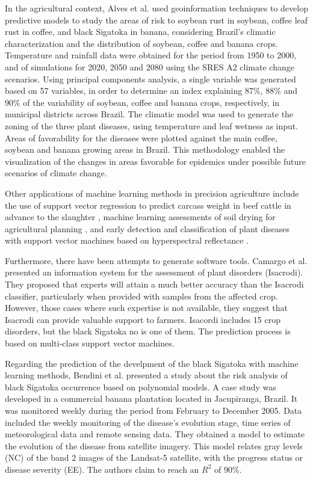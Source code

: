 \documentclass[review]{elsarticle}
\begin{document}
In the agricultural context, Alves et al. \citep{Alves2011} used  geoinformation techniques to develop predictive models to study the areas of risk to soybean rust in soybean, coffee leaf rust in coffee, and black Sigatoka in banana, considering Brazil’s climatic characterization and the distribution of soybean, coffee and banana crops. Temperature and rainfall data were obtained for the period from 1950 to 2000, and of simulations for 2020, 2050 and 2080 using the SRES A2 climate change scenarios. Using principal components analysis, a single variable was generated based on 57 variables, in order to determine an index explaining 87\%, 88\% and 90\% of the variability of soybean, coffee and banana crops, respectively, in municipal districts across Brazil. The climatic model was used to generate the zoning of the three plant diseases, using temperature and leaf wetness as input. Areas of favorability for the diseases were plotted against the main coffee, soybean and banana growing areas in Brazil. This methodology enabled the visualization of the changes in areas favorable for epidemics under possible future scenarios of climate change.

Other applications of machine learning methods in precision agriculture include the use of support vector regression to predict carcass weight in beef cattle in advance to the slaughter  \citep{Alonso2013}, machine learning assessments of soil drying for agricultural planning \citep{Coopersmith2014}, and early detection and classification of plant diseases with support vector machines based on hyperspectral reflectance \citep{Rumpf2010}.

Furthermore, there have been attempts to generate software tools. Camargo et al. \citep{Camargo2012} presented an information system for the assessment of plant disorders (Isacrodi). They proposed that experts will attain a much better accuracy than the Isacrodi classifier, particularly when provided with samples from the affected crop. However, those cases where such expertise is not available, they suggest that Isacrodi can provide valuable support to farmers. Isacordi includes 15 crop disorders, but the black Sigatoka no is one of them. The prediction process is based on multi-class support vector machines.

Regarding the prediction of the develpment of the black Sigatoka with machine learning methods, Bendini et al. \citep{Bendini2013}  presented a study about the risk analysis of black Sigatoka occurrence based on polynomial models. A case study was developed in a commercial banana plantation located in Jacupiranga, Brazil. It was monitored weekly during the period from February to December 2005. Data included the weekly monitoring of the disease’s evolution stage, time series of meteorological data and remote sensing data. They obtained a model to estimate the evolution of the disease from satellite imagery. This model relates gray levels (NC) of the band 2 images of the Landsat-5 satellite, with the progress status or disease severity (EE). The authors claim to reach an $R^2$ of 90\%.
\end{document}

